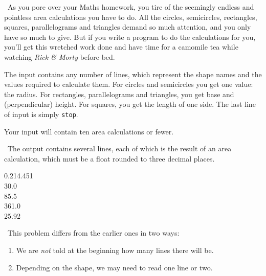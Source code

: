 
\Question\ As you pore over your Maths homework, you tire of the seemingly endless and
pointless area calculations you have to do. All the circles, semicircles, rectangles,
squares, parallelograms and triangles demand so much attention, and you only have so much
to give. But if you write a program to do the calculations for you, you'll get this
wretched work done and have time for a camomile tea while watching \emph{Rick \& Morty}
before bed.

\Input

The input contains any number of lines, which represent the shape names and the values
required to calculate them. For circles and semicircles you get one value: the radius. For
rectangles, parallelograms and triangles, you get base and (perpendicular) height. For
squares, you get the length of one side. The last line of input is simply \texttt{stop}.

Your input will contain ten area calculations or fewer.

\Output\ The output contains several lines, each of which is the result of an area
calculation, which must be a float rounded to three decimal places.

\Sample

       {0.2}{14.451\\30.0\\85.5\\361.0\\25.92}

\Scratch\ This problem differs from the earlier ones in two ways:
\begin{enumerate}
  \item We are \emph{not} told at the beginning how many lines there will be.
  \item Depending on the shape, we may need to read one line or two.
\end{enumerate}

